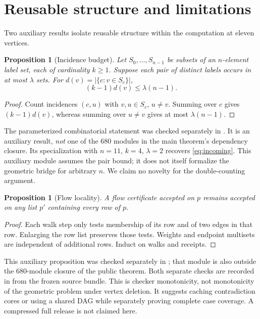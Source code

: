 \documentclass[11pt,a4paper]{article}
\newtheorem{proposition}[theorem]{Proposition}
\theoremstyle{definition}
\begin{document}
\section{Reusable structure and limitations}\label{sec:structure}
Two auxiliary results isolate reusable structure within the computation at eleven vertices.
\begin{proposition}[Incidence budget]\label{prop:incidence}
Let $S_0,\ldots,S_{n-1}$ be subsets of an $n$-element label set, each of cardinality $k\ge1$. Suppose each pair of distinct labels occurs in at most $\lambda$ sets. For $d(v)=|\{c:v\in S_c\}|$,
\[
 (k-1)d(v)\le\lambda(n-1).
\]
\end{proposition}
\begin{proof}
Count incidences $(c,u)$ with $v,u\in S_c$, $u\ne v$. Summing over $c$ gives $(k-1)d(v)$, whereas summing over $u\ne v$ gives at most $\lambda(n-1)$.
\end{proof}
The parameterized combinatorial statement was checked separately in . It is an auxiliary result, \emph{not} one of the 680 modules in the main theorem's dependency closure. Its specialization with $n=11$, $k=4$, $\lambda=2$ recovers \eqref{eq:incoming}. This auxiliary module assumes the pair bound; it does not itself formalize the geometric bridge for arbitrary $n$. We claim no novelty for the double-counting argument.

\begin{proposition}[Flow locality]\label{prop:locality}
A flow certificate accepted on $p$ remains accepted on any list $p'$ containing every row of $p$.
\end{proposition}
\begin{proof}
Each walk step only tests membership of its row and of two edges in that row. Enlarging the row list preserves those tests. Weights and endpoint multisets are independent of additional rows. Induct on walks and receipts.
\end{proof}
This auxiliary proposition was checked separately in ; that module is also outside the 680-module closure of the public theorem. Both separate checks are recorded in  from the frozen source bundle. This is checker monotonicity, not monotonicity of the geometric problem under vertex deletion. It suggests caching contradiction cores or using a shared DAG while separately proving complete case coverage. A compressed full release is not claimed here.
\end{document}
